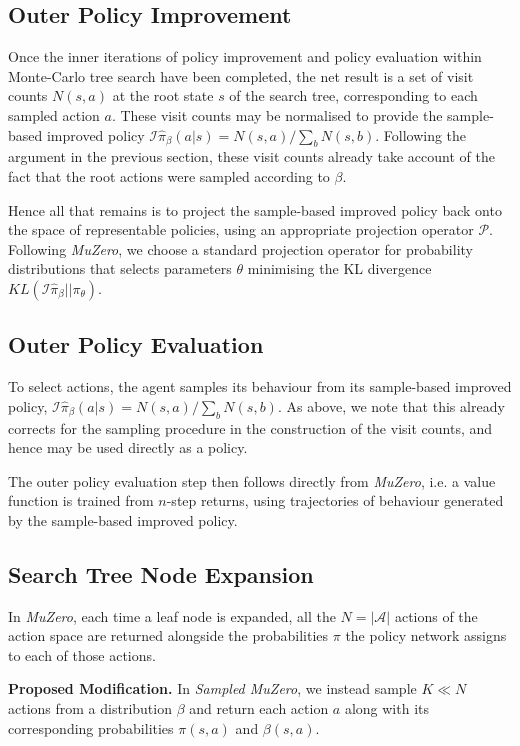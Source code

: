 \documentclass{article}
\newcommand{\muzero}{\emph{MuZero}}
\newcommand{\smuzero}{\emph{Sampled MuZero}}
\newcommand{\sample}{\beta}
\newcommand{\ihpi}{\mathcal{I}\hat{\pi}_\sample}
\begin{document}
\subsection{Outer Policy Improvement}

Once the inner iterations of policy improvement and policy evaluation within Monte-Carlo tree search have been completed, the net result is a set of visit counts $N(s,a)$ at the root state $s$ of the search tree, corresponding to each sampled action $a$. These visit counts may be normalised to provide the sample-based improved policy $\ihpi(a|s) = N(s,a) / \sum_b N(s,b)$. Following the argument in the previous section, these visit counts already take account of the fact that the root actions were sampled according to $\sample$.

Hence all that remains is to project the sample-based improved policy back onto the space of representable policies, using an appropriate projection operator $\mathcal{P}$. Following \muzero{}, we choose a standard projection operator for probability distributions that selects parameters $\theta$ minimising the KL divergence $KL(\ihpi || \pi_\theta)$.

\subsection{Outer Policy Evaluation}

To select actions, the agent samples its behaviour from its sample-based improved policy, $\ihpi(a|s) = N(s,a) / \sum_b N(s,b)$. As above, we note that this already corrects for the sampling procedure in the construction of the visit counts, and hence may be used directly as a policy.

The outer policy evaluation step then follows directly from \muzero{}, i.e. a value function is trained from $n$-step returns, using trajectories of behaviour generated by the sample-based improved policy.

\subsection{Search Tree Node Expansion}

In \muzero{}, each time a leaf node is expanded, all the $N=|\mathcal{A}|$ actions of the action space are returned alongside the probabilities $\pi$ the policy network assigns to each of those actions.

\textbf{Proposed Modification.}
In \smuzero{}, we instead sample $K\ll N$ actions from a distribution $\sample$ and return each action $a$ along with its corresponding probabilities $\pi(s,a)$ and $\sample(s,a)$.
\end{document}
